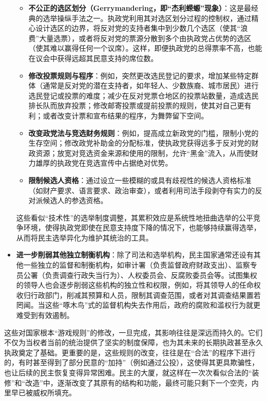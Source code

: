 \documentclass[UTF8, 10pt]{ctexbook}
\begin{document}
\begin{itemize}
        \begin{itemize}
            \item \textbf{不公正的选区划分（Gerrymandering，即“杰利蝾螈”现象）}：这是最经典的选举操纵手法之一。执政党利用其对选区划分过程的控制权，通过精心设计选区的边界，将反对党的支持者集中到少数几个选区（使其“浪费”大量选票），或者将反对党的票源分散到多个由执政党占优势的选区（使其难以赢得任何一个议席）。这样，即便执政党的总得票率不高，也能在议会中获得远超其民意支持的席位数。
            \item \textbf{修改投票规则与程序}：例如，突然更改选民登记的要求，增加某些特定群体（通常是反对党的潜在支持者，如年轻人、少数族裔、城市居民）进行选民登记或投票的难度；减少在反对党票仓地区的投票站数量，造成选民排长队而放弃投票；修改邮寄投票或提前投票的规则，使其对自己更有利；或者改变计票和宣布结果的程序，为舞弊留下空间。
            \item \textbf{改变政党法与竞选财务规则}：例如，提高成立新政党的门槛，限制小党的生存空间；修改政党补助金的分配标准，使执政党获得远多于反对党的财政资源；放宽对竞选资金来源和使用的限制，允许“黑金”流入，从而使财力雄厚的执政党在竞选宣传中占据绝对优势。
            \item \textbf{限制候选人资格}：通过设立一些模糊的或具有歧视性的候选人资格标准（如财产要求、语言要求、政治审查），或者利用司法手段剥夺有实力的反对派候选人的参选资格。
        \end{itemize}
    这些看似“技术性”的选举制度调整，其累积效应是系统性地扭曲选举的公平竞争环境，使得执政党即使在民意支持度下降的情况下，也能够持续赢得选举，从而将民主选举异化为维护其统治的工具。
    \item \textbf{进一步削弱其他独立制衡机构}：除了司法和选举机构，民主国家通常还设有其他一些独立的监督和制衡机构，如审计署（负责监督政府财政支出）、监察专员公署（负责调查行政失当行为）、人权委员会、反腐败委员会等。试图集权的领导人也会逐步削弱这些机构的独立性和权限，例如，将其领导人的任命权收归行政部门，削减其预算和人员，限制其调查范围，或者对其调查结果置若罔闻。当这些“啄木鸟”式的监督机构失去作用后，政府的腐败和滥权行为就更难受到有效遏制。
\end{itemize}
这些对国家根本“游戏规则”的修改，一旦完成，其影响往往是深远而持久的。它们不仅为当权者当前的统治提供了坚实的制度保障，也为其未来的长期执政甚至永久执政奠定了基础。更重要的是，这些规则的改变，往往是在“合法”的程序下进行的，有时甚至得到了部分民意的“加持”（例如通过公投），这使得其更具欺骗性，也让后续的民主恢复变得异常困难。民主的大厦，就这样在一次次看似合法的“装修”和“改造”中，逐渐改变了其原有的结构和功能，最终可能只剩下一个空壳，内里早已被威权所填充。
\end{document}
